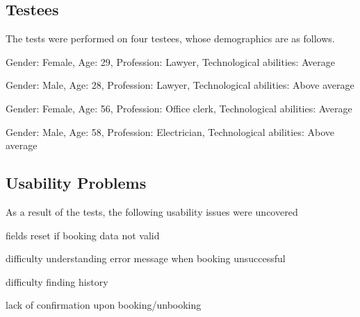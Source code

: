 \subsection{Testees}
The tests were performed on four testees, whose demographics are as follows.
\begin{description}[style=nextline]
\item[Subject 1]
Gender: Female, Age: 29, Profession: Lawyer, Technological abilities: Average
\item[Subject 2]
Gender: Male, Age: 28, Profession: Lawyer, Technological abilities: Above average
\item[Subject 3]
Gender: Female, Age: 56, Profession: Office clerk, Technological abilities: Average
\item[Subject 4]
Gender: Male, Age: 58, Profession: Electrician, Technological abilities: Above average
\end{description}

\subsection{Usability Problems}
As a result of the tests, the following usability issues were uncovered


fields reset if booking data not valid

difficulty understanding error message when booking unsuccessful

difficulty finding history

lack of confirmation upon booking/unbooking

